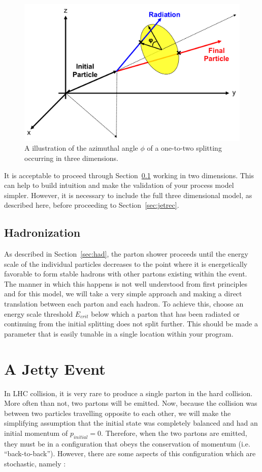 \documentclass[UKenglish,texlive=2016]{\ATLASLATEXPATH atlasdoc}
\begin{document}
\begin{figure}
\centering
\includegraphics[width=0.7\linewidth]{figures/azimuth.png}
\caption{A illustration of the azimuthal angle $\phi$ of a one-to-two splitting occurring in three dimensions.}
\label{fig:azimuth}
\end{figure}

It is acceptable to proceed through Section~\ref{sec:mc_had} working in two dimensions.  This can help to build intuition and make the validation of your process model simpler.  However, it is necessary to include the full three dimensional model, as described here, before proceeding to Section~\ref{sec:jetrec}.


\subsection{Hadronization}
\label{sec:mc_had}
As described in Section~\ref{sec:had}, the parton shower proceeds until the energy scale of the individual particles decreases to the point where it is energetically favorable to form stable hadrons with other partons existing within the event.  The manner in which this happens is not well understood from first principles and for this model, we will take a very simple approach and making a direct translation between each parton and each hadron.  To achieve this, choose an energy scale threshold $E_{crit}$ below which a parton that has been radiated or continuing from the initial splitting does not split further.  This should be made a parameter that is easily tunable in a single location within your program.

\section{A Jetty Event}
\label{sec:event}
In LHC collision, it is very rare to produce a single parton in the hard collision.  More often than not, two partons will be emitted.  Now, because the collision was between two particles travelling opposite to each other, we will make the simplifying assumption that the initial state was completely balanced and had an initial momentum of $p_{initial}=0$.  Therefore, when the two partons are emitted, they must be in a configuration that obeys the conservation of momentum (i.e. ``back-to-back'').  However, there are some aspects of this configuration which are stochastic, namely :
\end{document}
